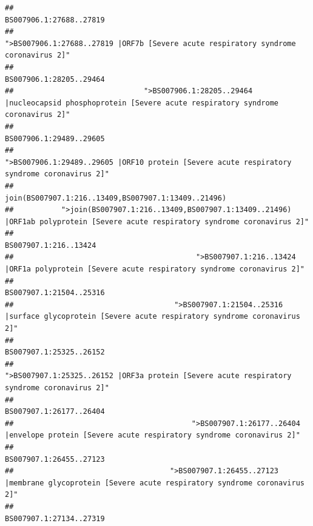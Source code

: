 \documentclass[
]{article}
\begin{document}
\begin{verbatim}
##                                                                                                                BS007906.1:27688..27819 
##                                                    ">BS007906.1:27688..27819 |ORF7b [Severe acute respiratory syndrome coronavirus 2]" 
##                                                                                                                BS007906.1:28205..29464 
##                              ">BS007906.1:28205..29464 |nucleocapsid phosphoprotein [Severe acute respiratory syndrome coronavirus 2]" 
##                                                                                                                BS007906.1:29489..29605 
##                                            ">BS007906.1:29489..29605 |ORF10 protein [Severe acute respiratory syndrome coronavirus 2]" 
##                                                                                    join(BS007907.1:216..13409,BS007907.1:13409..21496) 
##           ">join(BS007907.1:216..13409,BS007907.1:13409..21496) |ORF1ab polyprotein [Severe acute respiratory syndrome coronavirus 2]" 
##                                                                                                                  BS007907.1:216..13424 
##                                          ">BS007907.1:216..13424 |ORF1a polyprotein [Severe acute respiratory syndrome coronavirus 2]" 
##                                                                                                                BS007907.1:21504..25316 
##                                     ">BS007907.1:21504..25316 |surface glycoprotein [Severe acute respiratory syndrome coronavirus 2]" 
##                                                                                                                BS007907.1:25325..26152 
##                                            ">BS007907.1:25325..26152 |ORF3a protein [Severe acute respiratory syndrome coronavirus 2]" 
##                                                                                                                BS007907.1:26177..26404 
##                                         ">BS007907.1:26177..26404 |envelope protein [Severe acute respiratory syndrome coronavirus 2]" 
##                                                                                                                BS007907.1:26455..27123 
##                                    ">BS007907.1:26455..27123 |membrane glycoprotein [Severe acute respiratory syndrome coronavirus 2]" 
##                                                                                                                BS007907.1:27134..27319 

\end{verbatim}
\end{document}
